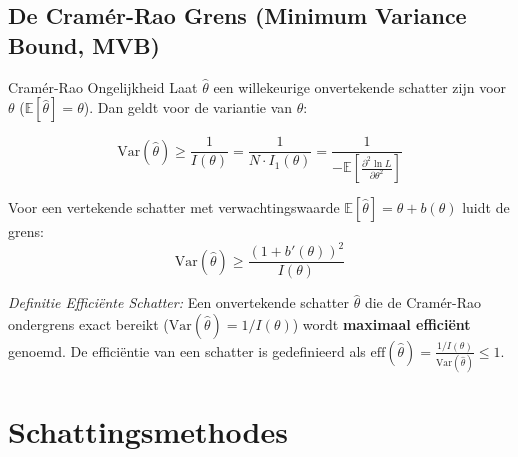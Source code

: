 \documentclass[11pt,a4paper]{article}
\newcommand{\E}{\mathbb{E}}
\newcommand{\Var}{\text{Var}}
\begin{document}
\subsection{De Cramér-Rao Grens (Minimum Variance Bound, MVB)}
\begin{theobox}{Cramér-Rao Ongelijkheid}
Laat $\hat{\theta}$ een willekeurige onvertekende schatter zijn voor $\theta$ ($\E[\hat{\theta}] = \theta$). Dan geldt voor de variantie van $\hat{\theta}$:
\begin{formulabox}
\begin{equation}
    \Var(\hat{\theta}) \ge \frac{1}{I(\theta)} = \frac{1}{N \cdot I_1(\theta)} = \frac{1}{-\E\left[ \frac{\partial^2 \ln L}{\partial \theta^2} \right]}
\end{equation}
\end{formulabox}
Voor een vertekende schatter met verwachtingswaarde $\E[\hat{\theta}] = \theta + b(\theta)$ luidt de grens:
\begin{equation}
    \Var(\hat{\theta}) \ge \frac{\left( 1 + b'(\theta) \right)^2}{I(\theta)}
\end{equation}
\end{theobox}

\emph{Definitie Efficiënte Schatter:} Een onvertekende schatter $\hat{\theta}$ die de Cramér-Rao ondergrens exact bereikt ($\Var(\hat{\theta}) = 1/I(\theta)$) wordt \textbf{maximaal efficiënt} genoemd. De efficiëntie van een schatter is gedefinieerd als $\text{eff}(\hat{\theta}) = \frac{1 / I(\theta)}{\Var(\hat{\theta})} \le 1$.


\section{Schattingsmethodes}
\end{document}

